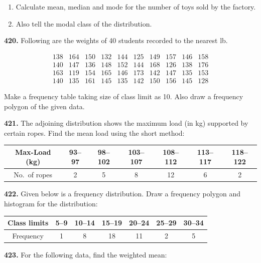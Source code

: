 \documentclass[11pt]{article}
\begin{document}
\begin{enumerate}[label=(\roman*)]
\item Calculate mean, median and mode for the number of toys sold by the factory.
\item Also tell the modal class of the distribution.
\end{enumerate}

\bigskip
\noindent\textbf{420.} Following are the weights of 40 students recorded to the nearest lb.

\[
\begin{array}{cccccccccc}
138 & 164 & 150 & 132 & 144 & 125 & 149 & 157 & 146 & 158 \\
140 & 147 & 136 & 148 & 152 & 144 & 168 & 126 & 138 & 176 \\
163 & 119 & 154 & 165 & 146 & 173 & 142 & 147 & 135 & 153 \\
140 & 135 & 161 & 145 & 135 & 142 & 150 & 156 & 145 & 128
\end{array}
\]

Make a frequency table taking size of class limit as 10. Also draw a frequency polygon of the given data.

\bigskip
\noindent\textbf{421.} The adjoining distribution shows the maximum load (in kg) supported by certain ropes. Find the mean load using the short method:

\begin{center}
\begin{tabular}{|c|c|c|c|c|c|c|}
\hline
Max-Load (kg) & 93--97 & 98--102 & 103--107 & 108--112 & 113--117 & 118--122 \\
\hline
No.\ of ropes & 2 & 5 & 8 & 12 & 6 & 2 \\
\hline
\end{tabular}
\end{center}

\bigskip
\noindent\textbf{422.} Given below is a frequency distribution. Draw a frequency polygon and histogram for the distribution:

\begin{center}
\begin{tabular}{|c|c|c|c|c|c|c|}
\hline
Class limits & 5--9 & 10--14 & 15--19 & 20--24 & 25--29 & 30--34 \\
\hline
Frequency & 1 & 8 & 18 & 11 & 2 & 5 \\
\hline
\end{tabular}
\end{center}

\bigskip
\noindent\textbf{423.} For the following data, find the weighted mean:
\end{document}
